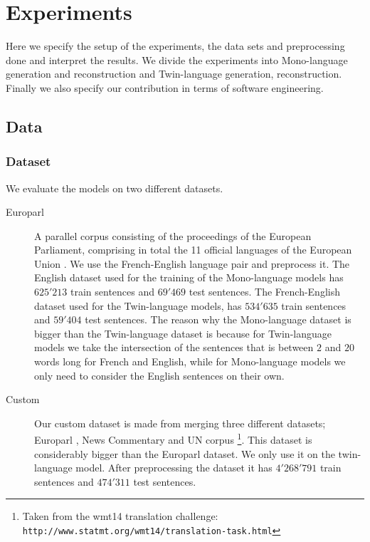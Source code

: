 \chapter{Experiments}
\label{ExperimentsCh}

Here we specify the setup of the experiments, the data sets and preprocessing
done and interpret the results. We divide the experiments into Mono-language
generation and reconstruction and Twin-language generation, reconstruction. Finally we also specify our contribution in terms of software engineering.

\section{Data}

\subsection{Dataset}

We evaluate the models on two different datasets.

\begin{description}
\item[Europarl] A parallel corpus consisting of the proceedings of the European
  Parliament,
  comprising in total the 11 official languages of the European Union
  \cite{koehn2005epc}. We use the French-English language pair and preprocess
  it. The English dataset used for the training of the Mono-language models has
  $625'213$ train sentences and $69'469$ test sentences. The French-English dataset used for
  the Twin-language models, has $534'635$ train sentences and $59'404$ test sentences. The
  reason why the Mono-language dataset is bigger than the Twin-language dataset
  is because for Twin-language models we take the intersection of the sentences that is
  between $2$ and $20$ words long for French and English, while for
  Mono-language models we only need to consider the English sentences on their own.
\item[Custom] Our custom dataset is made from merging three different datasets;
  Europarl \cite{koehn2005epc}, News Commentary and UN corpus
  \cite{ZIEMSKI16.1195} \footnote{Taken from the wmt14 translation challenge: \texttt{http://www.statmt.org/wmt14/translation-task.html}}. This dataset is
  considerably bigger than the Europarl dataset. We only use it on the 
  twin-language model. After preprocessing the dataset it has $4'268'791$ train
  sentences and $474'311$ test sentences.
\end{description}

